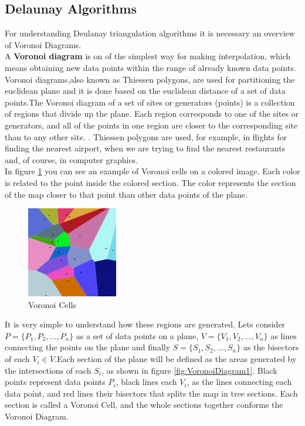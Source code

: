 \documentclass[conference]{IEEEtran}
\begin{document}
\subsection{Delaunay Algorithms}
For  understanding  Deulanay  triangulation  algorithms  it  is necessary an overview of Voronoi Diagrams.\\
A \textbf{ Voronoi diagram} is  on  of  the  simplest  way  for  making interpolation,  which  means  obtaining  new  data  points  within the  range  of  already  known  data  points.  Voronoi  diagrams,also known as Thiessen polygons, are used for partitioning the euclidean plane and it is done based on the euclidean distance of a set of data points.The Voronoi diagram of a set of sites or generators (points) is a  collection  of  regions  that  divide  up  the  plane.  Each  region corresponds  to  one  of  the  sites  or  generators,  and  all  of  the points in one region are closer to the corresponding site than to any other site. \cite{VoronoiD}. Thiessen polygons are used, for example, in  flights  for  finding  the  nearest  airport,  when  we  are  trying to  find  the  nearest  restaurants  and,  of  course,  in  computer graphics.\\In  figure  \ref{fig:VoronoiColored} you  can  see  an  example  of  Voronoi  cells  on  a colored  image.  Each  color  is  related  to  the  point  inside  the colored  section.  The  color  represents  the  section  of  the  map closer to that point than other data points of the plane.

\begin{figure}[H]
    \centering
    \includegraphics[width=150,height=150,keepaspectratio]{VoronoiColors.png}
    \caption{Voronoi Cells}
    \label{fig:VoronoiColored}
\end{figure}
    
It is very simple to understand how these regions are generated. Lets consider $P=\{P_1,P_2,...,P_n\}$ as a set of data points on a plane, $V={\{V_1,V_2,...,V_n\}}$ as lines connecting the points on the plane and finally $S={\{S_1,S_2,...,S_n\}}$ as the bisectors of each $V_i \in V$.Each section of the plane will be defined as the areas generated by the intersections of each $S_i$, as shown in figure \ref{fig:VoronoiDiagram1}. Black points represent data points $P_i$, black lines each $V_i$, as the lines connecting each data point, and red lines their bisectors that splits the map in tree sections. Each section is called a Voronoi Cell, and the whole sections together conforms the Voronoi Diagram.
\end{document}
